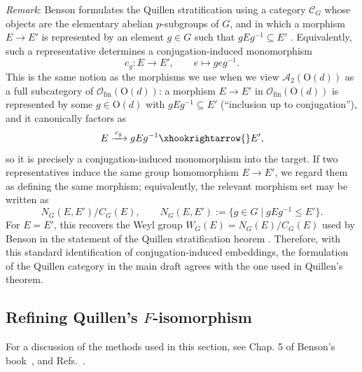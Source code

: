 \documentclass[aps,prx,reprint,superscriptaddress,twocolumn,amsmath,amssymb,amsfonts, nofootinbib]{revtex4-2}
\newcommand{\ofin}{\mathcal{O}_{\text{fin}}}
\newcommand{\qa}{\mathcal{A}_{2}}
\theoremstyle{apsstyle}
\begin{document}
\noindent \textit{Remark}: 
Benson formulates the Quillen stratification using a category
$\mathcal C_G$ whose objects are the elementary abelian $p$-subgroups of $G$,
and in which a morphism $E\to E'$ is represented by an element $g\in G$
such that $gEg^{-1}\subseteq E'$ \cite[p.~175]{Benson_Ch5}. Equivalently,
such a representative determines a conjugation-induced monomorphism
\begin{equation*}
  c_g:E\to E',
  \qquad
  e\mapsto geg^{-1}.
\end{equation*}
\noindent This is the same notion as the morphisms we use when we view $\qa(\mathrm{O}(d))$ as a full subcategory of $\ofin(\mathrm{O}(d))$: a morphism $E\to E'$ in $\ofin(\mathrm{O}(d))$ is represented by some $g\in \mathrm{O}(d)$ with $gEg^{-1}\subseteq E'$ (“inclusion up to conjugation”), and it canonically
factors as
\begin{equation*}
  E \xrightarrow{\,c_g\,} gEg^{-1} \xhookrightarrow{} E',
\end{equation*}
so it is precisely a conjugation-induced monomorphism into the target.
If two representatives induce the same group homomorphism $E\to E'$, we regard them as defining the same morphism; equivalently, the relevant
morphism set may be written as
\begin{equation*}
  N_G(E,E')/C_G(E),
  \qquad
  N_G(E,E'):=\{g\in G\mid gEg^{-1}\leq E'\}.
\end{equation*}
For $E=E'$, this recovers the Weyl group
$W_G(E)=N_G(E)/C_G(E)$ used by Benson in the statement of the Quillen stratification  heorem \cite[p.~174]{Benson_Ch5}. Therefore, with
this standard identification of conjugation-induced embeddings, the formulation of the Quillen category in the main draft agrees with the one used in
Quillen's theorem.







\subsection{Refining Quillen's $F$-isomorphism}
\label{app:refinement}

For a discussion of the methods used in this section, see Chap. 5 of Benson's book~\cite{Benson_Ch5}, and Refs.~\cite{Quillen71a, Quillen71bI, Quillen71bII, QuillenVenkov72, GLZ, HaLesh}.

\medskip
\end{document}
